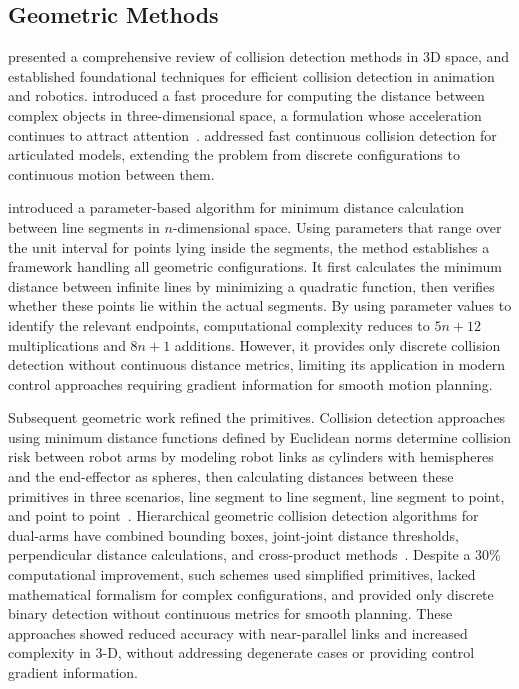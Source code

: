 \subsection{Geometric Methods}\label{subsec:lit_geometric}

\citet{jimenez2001collision} presented a comprehensive review of collision detection methods in 3D
space, and \citet{lin1993efficient} established foundational techniques for efficient collision
detection in animation and robotics. \citet{gilbert1988fast} introduced a fast procedure for
computing the distance between complex objects in three-dimensional space, a formulation whose
acceleration continues to attract attention~\citep{montaut2024gjk}. \citet{redon2005fast} addressed
fast continuous collision detection for articulated models, extending the problem from discrete
configurations to continuous motion between them.

\citet{lumelsky1985fast} introduced a parameter-based algorithm for minimum distance calculation
between line segments in $n$-dimensional space. Using parameters that range over the unit interval
for points lying inside the segments, the method establishes a framework handling all geometric
configurations. It first calculates the minimum distance between infinite lines by minimizing a
quadratic function, then verifies whether these points lie within the actual segments. By using
parameter values to identify the relevant endpoints, computational complexity reduces to $5n+12$
multiplications and $8n+1$ additions. However, it provides only discrete collision detection without
continuous distance metrics, limiting its application in modern control approaches requiring
gradient information for smooth motion planning.

Subsequent geometric work refined the primitives. Collision detection approaches using minimum
distance functions defined by Euclidean norms determine collision risk between robot arms by
modeling robot links as cylinders with hemispheres and the end-effector as spheres, then
calculating distances between these primitives in three scenarios, line segment to line segment,
line segment to point, and point to point~\citep{chang1990collision}. Hierarchical geometric collision detection algorithms for dual-arms have combined bounding boxes, joint-joint distance thresholds, perpendicular distance calculations, and cross-product methods~\citep{lee2001real}. Despite a 30\% computational improvement, such schemes used simplified primitives, lacked mathematical formalism for complex configurations, and provided only discrete binary detection without continuous metrics for smooth planning. These approaches showed reduced accuracy with near-parallel links and increased complexity in 3-D, without addressing degenerate cases or providing control gradient information.

